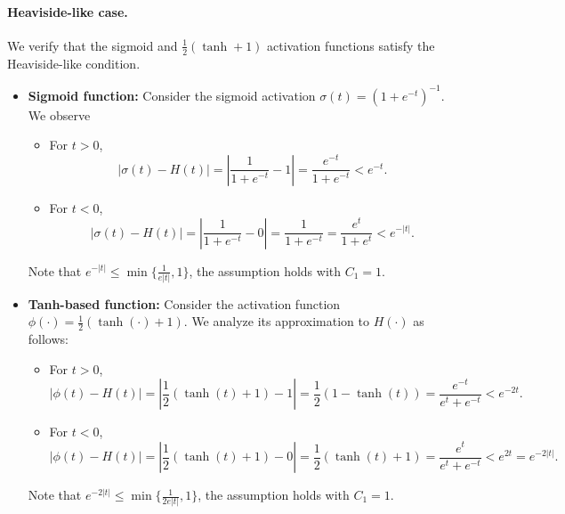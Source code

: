 \documentclass[11pt]{article}
\begin{document}

\paragraph{Heaviside-like case.}

We  verify that the sigmoid and $\frac{1}{2}(\tanh + 1)$ activation functions satisfy the Heaviside-like condition.
\begin{itemize}
    \item \textbf{Sigmoid function:} Consider the sigmoid activation $\sigma(t) = (1+e^{-t})^{-1}$. We observe
    \begin{itemize}
    \item For $t > 0$, 
    \begin{equation*}
        |\sigma(t) - H(t)| = \left| \frac{1}{1+e^{-t}} - 1 \right| = \frac{e^{-t}}{1+e^{-t}} < e^{-t}.
    \end{equation*}
    \item For $t < 0$, 
    \begin{equation*}
        |\sigma(t) - H(t)| = \left| \frac{1}{1+e^{-t}} - 0 \right| = \frac{1}{1+e^{-t}} = \frac{e^t}{1+e^t} < e^{-|t|}.
    \end{equation*}
\end{itemize}
    Note that $e^{-|t|} \leq  \min \{\frac{1}{e |t|},1\}$, the assumption holds with $C_1 = 1$.

    \item \textbf{Tanh-based function:} Consider the activation function $\phi(\cdot) = \frac{1}{2}(\tanh (\cdot)+ 1)$. We analyze its approximation to $H(\cdot)$ as follows:
    \begin{itemize}
    \item For $t > 0$,
    \begin{equation*}
        |\phi(t) - H(t)| = \left| \frac{1}{2}(\tanh(t) + 1) - 1 \right| = \frac{1}{2}(1 - \tanh(t)) = \frac{e^{-t}}{e^t + e^{-t}} < e^{-2t}.
    \end{equation*}
    \item For $t < 0$,
    \begin{equation*}
        |\phi(t) - H(t)| = \left| \frac{1}{2}(\tanh(t) + 1) - 0 \right| = \frac{1}{2}(\tanh(t) + 1) = \frac{e^t}{e^t + e^{-t}} < e^{2t} = e^{-2|t|}.
    \end{equation*}
\end{itemize}
    Note that $e^{-2|t|} \leq  \min \{\frac{1}{2e |t|},1\}$, the assumption holds with $C_1 = 1$.
\end{itemize}
\end{document}
